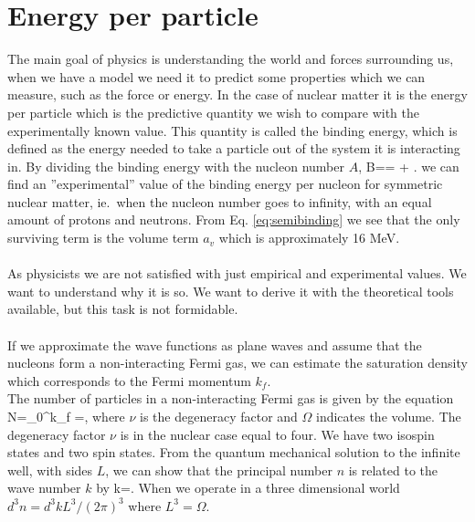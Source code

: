 
\section{Energy per particle}

The main goal of physics is understanding the world and forces surrounding us,
when we have a model we need it to predict some properties which we can
measure, such as the force or energy. In the case of nuclear matter it is the
energy per particle which is the predictive quantity we wish to compare with
the experimentally known value. This quantity is called the
binding energy, which is defined as the energy needed to take a particle out of
the system it is interacting in. By dividing the binding energy with the nucleon number $A$,  
\be
B==  + .
\ee 
we can find an ''experimental'' value of the binding energy per nucleon
for symmetric nuclear matter, ie.~when the nucleon number  goes to infinity,
with an equal amount of protons and neutrons.  
From Eq. \eqref{eq:semibinding} we see that the only surviving term is the volume term $a_v$ which is approximately 16 MeV.\\
\\
As physicists we are not satisfied with just empirical and experimental values.
We want  to understand why it is so. We want to derive it with the theoretical
tools available, but this task is not formidable.\\
\\
If we approximate the wave functions as plane waves and assume that the 
nucleons form a non-interacting Fermi gas, we can estimate the saturation density which corresponds to the Fermi momentum $k_f$.
\\
The number of particles in a non-interacting Fermi gas is given by the equation
\be
N=\nu \int_0^{k_f}\Omega {} =\Omega  \nu {},
\label{Eq:nr_partic}
\ee 
where $\nu$ is the degeneracy factor and $\Omega$ indicates the volume. The degeneracy factor $\nu$ is in the nuclear case equal to four. We have two isospin states and two spin states. From the quantum mechanical solution to 
the infinite well, with sides $L$, we can show that the principal number $n$ is related to the wave number $ k $ by 
\be
k=.
\ee
When we operate in a three dimensional world $ d^3n=d^3k L^3/(2\pi)^3$ where $ L^3=\Omega$.\\
